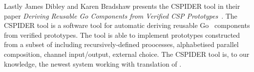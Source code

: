 Lastly James Dibley and Karen Bradshaw presents the CSPIDER tool in their paper \textit{Deriving Reusable Go Components from Verified CSP Prototypes}~\cite{Dibley2018}. The CSPIDER tool is a software tool for automatic deriving reusable Go~\cite{Go} components from verified \cspm{} prototypes. The tool is able to implement prototypes constructed from a subset of \cspm{} including recursively-defined proocesses, alphabetised parallel composition, channel input/output, external choice. The CSPIDER tool is, to our knowledge, the newest system working with translation of \cspm{}.